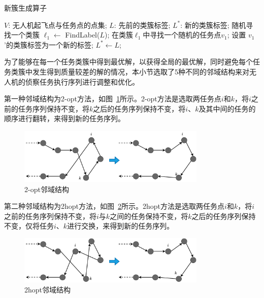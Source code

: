 \begin{algorithm}[!htbp]
  \caption{新簇生成算子} %
  \label{alg:New Cluster Generation Neighborhood Structure}
  \begin{algorithmic}[1]
    \REQUIRE
      $V$: 无人机起飞点与任务点的点集;
      $L$: 先前的类簇标签;
    \ENSURE
      $L^*$: 新的类簇标签;
    \STATE 随机寻找一个类簇 $\ell_1 \gets$ FindLabel($L$);
    \STATE 在类簇$\ell_1$中寻找一个随机的任务点$v_1$;
    \STATE 设置 $v_1$'的类簇标签为一个新的标签;
    \STATE $L^* \gets L$;
  \end{algorithmic}
\end{algorithm}

为了能够在每一个任务类簇中得到最优解，以获得全局的最优解，同时避免每个任务类簇中发生得到质量较差的解的情况，本小节选取了5种不同的邻域结构来对无人机的侦察任务执行序列进行调整和优化。

第一种邻域结构为2-opt方法\citep{croes1958MethodSolvingTravelingSalesman}，如图~\ref{fig:2-opt邻域结构}所示。2-opt方法是选取两任务点\( i \)和\( k \)，将\( i \)之前的任务序列保持不变，将\( k \)之后的任务序列保持不变，将\( i \)、\( k \)及其中间的任务的顺序进行翻转，来得到新的任务序列。

\begin{figure}[!htbp]
    \centering
    \includegraphics[width=0.8\textwidth]{images/2-opt.pdf}
    \caption{2-opt邻域结构}
    \label{fig:2-opt邻域结构}
\end{figure}

第二种邻域结构为2hopt方法，如图~\ref{fig:2hopt邻域结构}所示。2hopt方法是选取两任务点\( i \)和\( k \)，将\( i \)之前的任务序列保持不变，将\( i \)与\( k \)之间的任务保持不变，将\( k \)之后的任务序列保持不变，仅将任务\( i \)、\( k \)进行交换，来得到新的任务序列。

\begin{figure}[!htbp]
    \centering
    \includegraphics[width=0.8\textwidth]{images/2hopt.pdf}
    \caption{2hopt邻域结构}
    \label{fig:2hopt邻域结构}
\end{figure}


